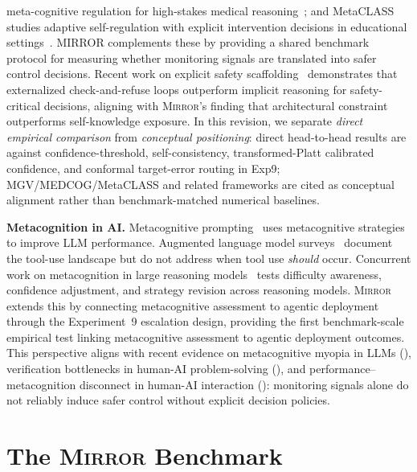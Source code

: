 \documentclass[10pt]{article}
\newcommand{\mirror}{\textsc{Mirror}}
\begin{document}
meta-cognitive regulation for high-stakes medical reasoning~\citep{zhao2026medcog};
and MetaCLASS studies adaptive self-regulation with explicit intervention
decisions in educational settings~\citep{liu2026metaclass}. MIRROR complements
these by providing a shared benchmark protocol for measuring whether monitoring
signals are translated into safer control decisions.
Recent work on explicit safety scaffolding~\citep{mosaic2026} demonstrates that
externalized check-and-refuse loops outperform implicit reasoning for
safety-critical decisions, aligning with \mirror{}'s finding that architectural
constraint outperforms self-knowledge exposure.
In this revision, we separate \textit{direct empirical comparison} from
\textit{conceptual positioning}: direct head-to-head results are against
confidence-threshold, self-consistency, transformed-Platt calibrated confidence,
and conformal target-error routing in Exp9; MGV/MEDCOG/MetaCLASS and related
frameworks are cited as conceptual alignment rather than benchmark-matched
numerical baselines.

\textbf{Metacognition in AI.}
Metacognitive prompting~\citep{wang2024metacognitive} uses metacognitive strategies
to improve LLM performance. Augmented language model surveys~\citep{mialon2023augmented}
document the tool-use landscape but do not address when tool use \textit{should}
occur. Concurrent work on metacognition in large reasoning
models~\citep{metacog2026} tests difficulty awareness, confidence adjustment, and
strategy revision across reasoning models. \mirror{} extends this by connecting
metacognitive assessment to agentic deployment through the Experiment~9 escalation
design, providing the first benchmark-scale empirical test linking metacognitive
assessment to agentic deployment outcomes.
This perspective aligns with recent evidence on metacognitive myopia in LLMs
(\citealp{scholten2024metacognitivemyopia}), verification bottlenecks in human-AI
problem-solving (\citealp{huemmer2026verificationbottleneck}), and
performance--metacognition disconnect in human-AI interaction
(\citealp{fernandes2024disconnect}): monitoring signals alone do not reliably
induce safer control without explicit decision policies.

\section{The \mirror{} Benchmark}
\label{sec:benchmark}
\end{document}
